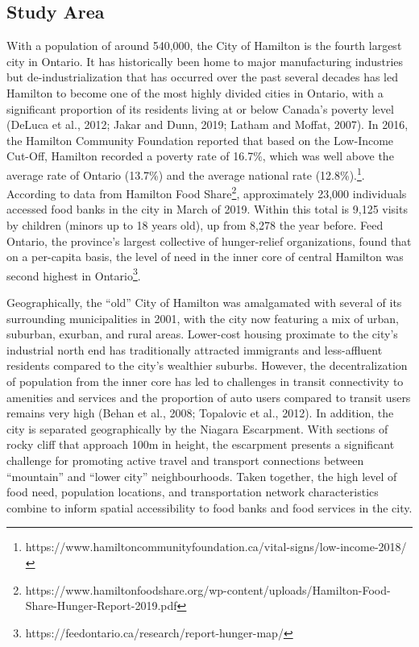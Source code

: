 \documentclass[]{elsarticle} %
\begin{document}
\hypertarget{study-area}{%
\subsection{Study Area}\label{study-area}}

With a population of around 540,000, the City of Hamilton is the fourth
largest city in Ontario. It has historically been home to major
manufacturing industries but de-industrialization that has occurred over
the past several decades has led Hamilton to become one of the most
highly divided cities in Ontario, with a significant proportion of its
residents living at or below Canada's poverty level (DeLuca et al.,
2012; Jakar and Dunn, 2019; Latham and Moffat, 2007). In 2016, the
Hamilton Community Foundation reported that based on the Low-Income
Cut-Off, Hamilton recorded a poverty rate of 16.7\%, which was well
above the average rate of Ontario (13.7\%) and the average national rate
(12.8\%).\footnote{https://www.hamiltoncommunityfoundation.ca/vital-signs/low-income-2018/}.
According to data from Hamilton Food Share\footnote{https://www.hamiltonfoodshare.org/wp-content/uploads/Hamilton-Food-Share-Hunger-Report-2019.pdf},
approximately 23,000 individuals accessed food banks in the city in
March of 2019. Within this total is 9,125 visits by children (minors up
to 18 years old), up from 8,278 the year before. Feed Ontario, the
province's largest collective of hunger-relief organizations, found that
on a per-capita basis, the level of need in the inner core of central
Hamilton was second highest in Ontario\footnote{https://feedontario.ca/research/report-hunger-map/}.

Geographically, the ``old'' City of Hamilton was amalgamated with
several of its surrounding municipalities in 2001, with the city now
featuring a mix of urban, suburban, exurban, and rural areas. Lower-cost
housing proximate to the city's industrial north end has traditionally
attracted immigrants and less-affluent residents compared to the city's
wealthier suburbs. However, the decentralization of population from the
inner core has led to challenges in transit connectivity to amenities
and services and the proportion of auto users compared to transit users
remains very high (Behan et al., 2008; Topalovic et al., 2012). In
addition, the city is separated geographically by the Niagara
Escarpment. With sections of rocky cliff that approach 100m in height,
the escarpment presents a significant challenge for promoting active
travel and transport connections between ``mountain'' and ``lower city''
neighbourhoods. Taken together, the high level of food need, population
locations, and transportation network characteristics combine to inform
spatial accessibility to food banks and food services in the city.
\end{document}
